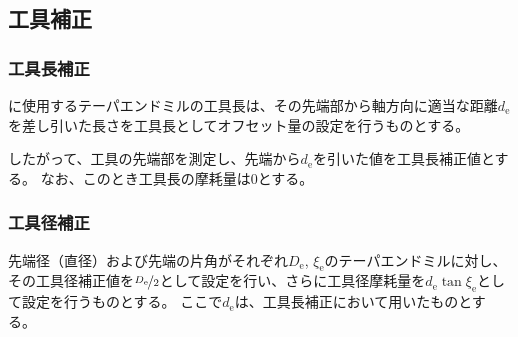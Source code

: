 \subsection{工具補正}

\subsubsection{工具長補正}
\EndFaceCChamferMilling に使用するテーパエンドミルの工具長は、その先端部から軸方向に適当な距離$d_\mathrm e$を差し引いた長さを工具長としてオフセット量の設定を行うものとする。

したがって、工具の先端部を測定し、先端から$d_\mathrm e$を引いた値を工具長補正値とする。
なお、このとき工具長の摩耗量は0とする。

\subsubsection{工具径補正}
先端径（直径）および先端の片角がそれぞれ$D_\mathrm e$, $\xi_\mathrm e$のテーパエンドミルに対し、その工具径補正値を$\nicefrac{D_\mathrm e}2$として設定を行い、さらに工具径摩耗量を$d_\mathrm e\tan\xi_\mathrm e$として設定を行うものとする。
ここで$d_\mathrm e$は、工具長補正において用いたものとする。


\subsection{\EndFaceOutCChamferMilling}


